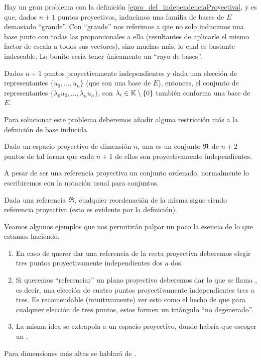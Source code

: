 Hay un gran problema con la definición \ref{epro_def_independenciaProyectiva}, y es que, dados $n+1$ puntos proyectivos, inducimos una familia de bases de $E$ demasiado ``grande''. Con ``grande'' nos referimos a que no solo inducimos una base junto con todas las proporcionales a ella (resultantes de aplicarle el mismo factor de escala a todos sus vectores), sino muchas más, lo cual es bastante indeseable. Lo bonito sería tener únicamente un ``rayo de bases''.
\begin{obs}
	\label{epro_obs_noUnicidadBase}
	Dados $n+1$ puntos proyectivamente independientes y dada una elección de representantes $\{u_0,\dots,u_n\}$ (que son una base de $E$), entonces, el conjunto de representantes $\{\lambda_0u_0,\dots,\lambda_nu_n\}$, con $\lambda_i\in\mathbb{K}\setminus\{0\}$ también conforma una base de $E$.
\end{obs}
Para solucionar este problema deberemos añadir alguna restricción más a la definición de base inducida.
\begin{defi}
	\label{epro_def_refereciaProyectiva}
	Dado un espacio proyectivo de dimensión $n$, una  es un conjunto  $\mathfrak{R}$ de $n+2$ puntos de tal forma que cada $n+1$ de ellos son proyectivamente independientes. 
\end{defi}
A pesar de ser una referencia proyectiva un conjunto ordenado, normalmente lo escribiremos con la notación usual para conjuntos.
\begin{obs}[Reordenación]
	\label{epro_obs_reordenacionReferencias}
	Dada una referencia $\mathfrak{R}$, cualquier reordenación de la misma sigue siendo referencia proyectiva (esto es evidente por la definición).
\end{obs} 
\begin{exa}
	\label{epro_exa_dimensionesBajas}
	Veamos algunos ejemplos que nos permitirán palpar un poco la esencia de lo que estamos haciendo.
	\begin{enumerate}
		\item En caso de querer dar una referencia de la recta proyectiva deberemos elegir tres puntos proyectivamente independientes dos a dos.
		\item Si queremos ``referenciar'' un plano proyectivo deberemos dar lo que se llama , es decir, una elección de cuatro puntos proyectivamente independientes tres a tres. Es recomendable (intuitivamente) ver esto como el hecho de que para cualquier elección de tres puntos, estos formen un triángulo ``no degenerado''.
		\item La misma idea se extrapola a un espacio proyectivo, donde habría que escoger un .
	\end{enumerate}
	Para dimensiones más altas se hablará de .
\end{exa}
